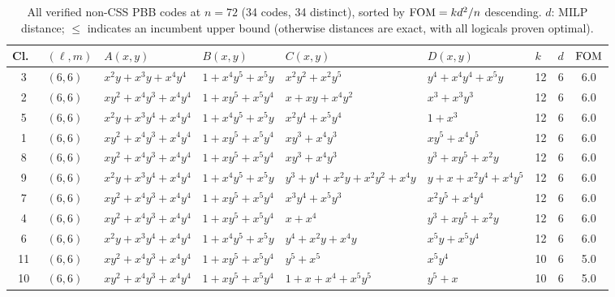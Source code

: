 \begin{table}[t]
\centering
\caption{All verified non-CSS PBB codes at $n = 72$ (34 codes, 34 distinct), sorted by $\mathrm{FOM} = kd^2/n$ descending.
$d$: MILP distance; $\leq$ indicates an incumbent upper bound (otherwise distances are exact, with all logicals proven optimal).}
\label{tab:pbb_cat72}
\tiny
\renewcommand{\arraystretch}{0.82}
\setlength{\tabcolsep}{1.5pt}
\begin{tabular*}{\textwidth}{@{\extracolsep{\fill}}cllllllcc}
\toprule
Cl.\ & $(\ell,m)$ & $A(x,y)$ & $B(x,y)$ & $C(x,y)$ & $D(x,y)$ & $k$ & $d$ & $\mathrm{FOM}$ \\
\midrule
3 & $(6,6)$ & $x^{2}y{+}x^{3}y{+}x^{4}y^{4}$ & $1{+}x^{4}y^{5}{+}x^{5}y$ & $x^{2}y^{2}{+}x^{2}y^{5}$ & $y^{4}{+}x^{4}y^{4}{+}x^{5}y$ & 12 & 6 & 6.0 \\
2 & $(6,6)$ & $xy^{2}{+}x^{4}y^{3}{+}x^{4}y^{4}$ & $1{+}xy^{5}{+}x^{5}y^{4}$ & $x{+}xy{+}x^{4}y^{2}$ & $x^{3}{+}x^{3}y^{3}$ & 12 & 6 & 6.0 \\
5 & $(6,6)$ & $x^{2}y{+}x^{3}y^{4}{+}x^{4}y^{4}$ & $1{+}x^{4}y^{5}{+}x^{5}y$ & $x^{2}y^{4}{+}x^{5}y^{4}$ & $1{+}x^{3}$ & 12 & 6 & 6.0 \\
1 & $(6,6)$ & $xy^{2}{+}x^{4}y^{3}{+}x^{4}y^{4}$ & $1{+}xy^{5}{+}x^{5}y^{4}$ & $xy^{3}{+}x^{4}y^{3}$ & $xy^{5}{+}x^{4}y^{5}$ & 12 & 6 & 6.0 \\
8 & $(6,6)$ & $xy^{2}{+}x^{4}y^{3}{+}x^{4}y^{4}$ & $1{+}xy^{5}{+}x^{5}y^{4}$ & $xy^{3}{+}x^{4}y^{3}$ & $y^{3}{+}xy^{5}{+}x^{2}y$ & 12 & 6 & 6.0 \\
9 & $(6,6)$ & $x^{2}y{+}x^{3}y^{4}{+}x^{4}y^{4}$ & $1{+}x^{4}y^{5}{+}x^{5}y$ & $y^{3}{+}y^{4}{+}x^{2}y{+}x^{2}y^{2}{+}x^{4}y$ & $y{+}x{+}x^{2}y^{4}{+}x^{4}y^{5}$ & 12 & 6 & 6.0 \\
7 & $(6,6)$ & $xy^{2}{+}x^{4}y^{3}{+}x^{4}y^{4}$ & $1{+}xy^{5}{+}x^{5}y^{4}$ & $x^{3}y^{4}{+}x^{5}y^{3}$ & $x^{2}y^{5}{+}x^{4}y^{4}$ & 12 & 6 & 6.0 \\
4 & $(6,6)$ & $xy^{2}{+}x^{4}y^{3}{+}x^{4}y^{4}$ & $1{+}xy^{5}{+}x^{5}y^{4}$ & $x{+}x^{4}$ & $y^{3}{+}xy^{5}{+}x^{2}y$ & 12 & 6 & 6.0 \\
6 & $(6,6)$ & $x^{2}y{+}x^{3}y^{4}{+}x^{4}y^{4}$ & $1{+}x^{4}y^{5}{+}x^{5}y$ & $y^{4}{+}x^{2}y{+}x^{4}y$ & $x^{5}y{+}x^{5}y^{4}$ & 12 & 6 & 6.0 \\
11 & $(6,6)$ & $xy^{2}{+}x^{4}y^{3}{+}x^{4}y^{4}$ & $1{+}xy^{5}{+}x^{5}y^{4}$ & $y^{5}{+}x^{5}$ & $x^{5}y^{4}$ & 10 & 6 & 5.0 \\
10 & $(6,6)$ & $xy^{2}{+}x^{4}y^{3}{+}x^{4}y^{4}$ & $1{+}xy^{5}{+}x^{5}y^{4}$ & $1{+}x{+}x^{4}{+}x^{5}y^{5}$ & $y^{5}{+}x$ & 10 & 6 & 5.0 \\

\end{tabular*}
\end{table}
